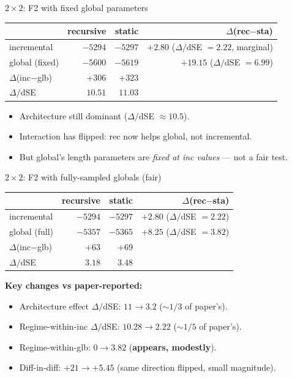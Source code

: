 \documentclass[10pt,aspectratio=169]{beamer}
\newcommand{\hl}[1]{{\color{hlblue}\textbf{#1}}}
\newcommand{\bad}[1]{{\color{hlred}#1}}
\newcommand{\new}[1]{{\color{hlgold}\textbf{#1}}}
\begin{document}
\begin{frame}{$2\!\times\!2$: F2 with fixed global parameters}
\begin{center}
\begin{tabular}{l|rr|r}
\toprule
             & recursive & static & $\Delta$(rec$-$sta) \\
\midrule
incremental   & $-5294$ & $-5297$ & $+2.80$ ($\Delta/$dSE $= 2.22$, marginal) \\
global (fixed)& $-5600$ & $-5619$ & \hl{$+19.15$} ($\Delta/$dSE $= 6.99$) \\
\midrule
$\Delta$(inc$-$glb) & $+306$ & $+323$ & \\
$\Delta/$dSE        & $10.51$ & $11.03$ & \\
\bottomrule
\end{tabular}
\end{center}

\vspace{0.8em}
\begin{itemize}\itemsep0.2em
  \item Architecture still dominant ($\Delta/$dSE $\approx 10.5$).
  \item \bad{Interaction has flipped}: rec now helps global, not incremental.
  \item But global's length parameters are \emph{fixed at inc values} --- not a fair test.
\end{itemize}
\end{frame}

\begin{frame}{$2\!\times\!2$: F2 with fully-sampled globals (fair)}
\begin{center}
\begin{tabular}{l|rr|r}
\toprule
            & recursive & static & $\Delta$(rec$-$sta) \\
\midrule
incremental & $-5294$ & $-5297$ & $+2.80$ ($\Delta/$dSE $= 2.22$) \\
global (full) & $-5357$ & $-5365$ & $+8.25$ ($\Delta/$dSE $= 3.82$) \\
\midrule
$\Delta$(inc$-$glb) & $+63$ & $+69$ & \\
$\Delta/$dSE        & \hl{$3.18$} & \hl{$3.48$} & \\
\bottomrule
\end{tabular}
\end{center}

\vspace{0.8em}
\hl{Key changes vs paper-reported:}
\begin{itemize}\itemsep0.2em
  \item Architecture effect $\Delta/$dSE: $11 \to 3.2$ (\bad{$\sim\!1/3$ of paper's}).
  \item Regime-within-inc $\Delta/$dSE: $10.28 \to 2.22$ (\bad{$\sim\!1/5$ of paper's}).
  \item Regime-within-glb: $0 \to 3.82$ (\new{appears, modestly}).
  \item Diff-in-diff: $+21 \to +5.45$ (same direction flipped, small magnitude).
\end{itemize}
\end{frame}
\end{document}

